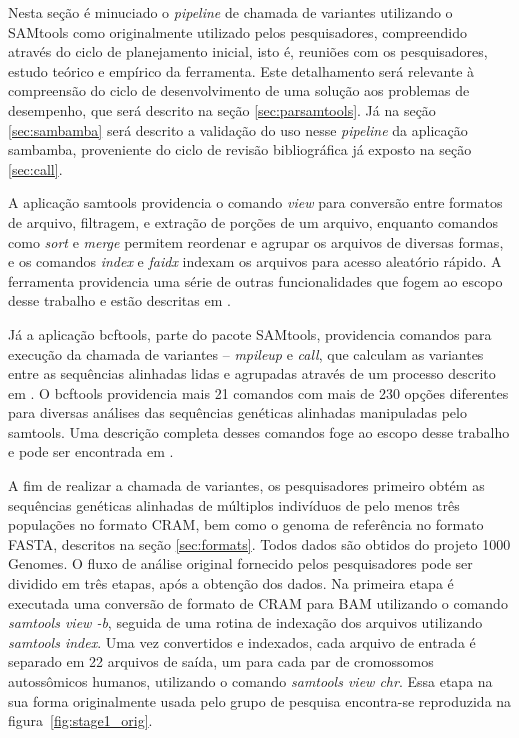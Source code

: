 \documentclass[cic,tc]{iiufrgs}
\begin{document}
Nesta seção é minuciado o \textit{pipeline} de chamada de variantes utilizando
o SAMtools como originalmente utilizado pelos pesquisadores, compreendido
através do ciclo de planejamento inicial, isto é, reuniões com os
pesquisadores, estudo teórico e empírico da ferramenta. Este detalhamento será
relevante à compreensão do ciclo de desenvolvimento de uma solução aos
problemas de desempenho, que será descrito na seção \ref{sec:parsamtools}.
Já na seção \ref{sec:sambamba} será descrito a validação do uso nesse \textit{pipeline}
da aplicação sambamba, proveniente do ciclo de revisão bibliográfica já exposto
na seção \ref{sec:call}.

A aplicação samtools providencia o comando \textit{view} para conversão entre
formatos de arquivo, filtragem, e extração de porções de um arquivo, enquanto
comandos como \textit{sort} e \textit{merge} permitem reordenar e agrupar os
arquivos de diversas formas, e os comandos \textit{index} e \textit{faidx}
indexam os arquivos para acesso aleatório rápido. A ferramenta providencia uma
série de outras funcionalidades que fogem ao escopo desse trabalho e estão
descritas em \cite{danecek2021twelve}.

Já a aplicação bcftools, parte do pacote SAMtools, providencia comandos para
execução da chamada de variantes -- \textit{mpileup} e \textit{call}, que
calculam as variantes entre as sequências alinhadas lidas e agrupadas através
de um processo descrito em \cite{li2011improving}. O bcftools providencia mais
21 comandos com mais de 230 opções diferentes para diversas análises das
sequências genéticas alinhadas manipuladas pelo samtools. Uma descrição
completa desses comandos foge ao escopo desse trabalho e pode ser encontrada em
\cite{danecek2021twelve}.

A fim de realizar a chamada de variantes, os pesquisadores primeiro obtém as
sequências genéticas alinhadas de múltiplos indivíduos de pelo menos três
populações no formato CRAM, bem como o genoma de referência no formato FASTA,
descritos na seção \ref{sec:formats}. Todos dados são obtidos do projeto 1000
Genomes. O fluxo de análise original fornecido pelos pesquisadores pode ser
dividido em três etapas, após a obtenção dos dados. Na primeira etapa é
executada uma conversão de formato de CRAM para BAM utilizando o comando
\textit{samtools view -b}, seguida de uma rotina de indexação dos arquivos
utilizando \textit{samtools index}. Uma vez convertidos e indexados, cada
arquivo de entrada é separado em 22 arquivos de saída, um para cada par de
cromossomos autossômicos humanos, utilizando o comando \textit{samtools view
chr}. Essa etapa na sua forma originalmente usada pelo grupo de pesquisa
encontra-se reproduzida na figura~\ref{fig:stage1_orig}.
\end{document}
